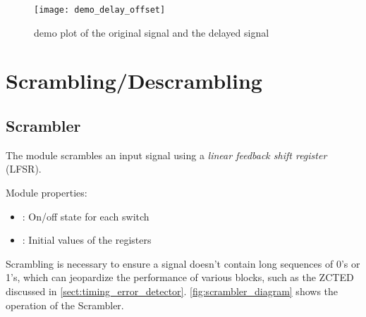 \begin{figure}[H]
  \centering
  \texttt{[image: demo\_delay\_offset]}
  \caption{ demo plot of the original signal and the delayed signal}
  \label{fig:demo_delay_offset}
\end{figure}

\section{Scrambling/Descrambling}

\subsection{Scrambler}

The  module scrambles an input signal using a \emph{linear feedback shift register} (LFSR).

\noindent Module properties:
\begin{itemize}
  \item {}: On/off state for each switch
  \item {}: Initial values of the registers
\end{itemize}

Scrambling is necessary to ensure a signal doesn't contain long sequences of 0's or 1's, which can jeopardize the performance of various blocks, such as the ZCTED discussed in \autoref{sect:timing_error_detector}. \autoref{fig:scrambler_diagram} shows the operation of the Scrambler.

